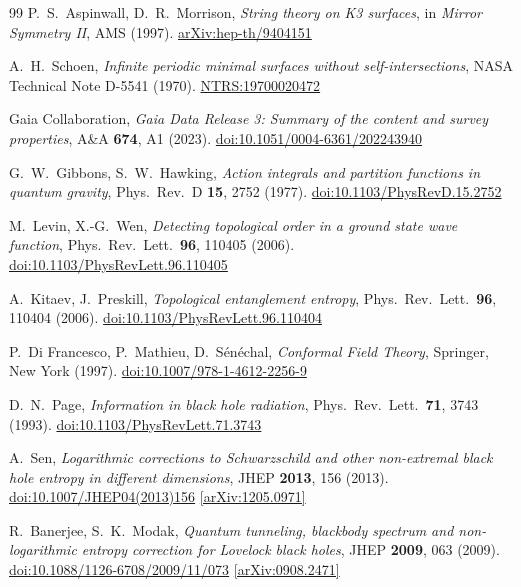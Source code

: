 \documentclass[11pt,a4paper]{article}
\begin{document}
\begin{thebibliography}{99}
  P.~S.~Aspinwall, D.~R.~Morrison,
  \textit{String theory on K3 surfaces},
  in \textit{Mirror Symmetry II}, AMS (1997).
  \href{https://arxiv.org/abs/hep-th/9404151}{arXiv:hep-th/9404151}

  A.~H.~Schoen,
  \textit{Infinite periodic minimal surfaces without self-intersections},
  NASA Technical Note D-5541 (1970).
  \href{https://ntrs.nasa.gov/citations/19700020472}{NTRS:19700020472}

  Gaia Collaboration,
  \textit{Gaia Data Release 3: Summary of the content and survey properties},
  A\&A \textbf{674}, A1 (2023).
  \href{https://doi.org/10.1051/0004-6361/202243940}{doi:10.1051/0004-6361/202243940}

  G.~W.~Gibbons, S.~W.~Hawking,
  \textit{Action integrals and partition functions in quantum gravity},
  Phys.\ Rev.\ D \textbf{15}, 2752 (1977).
  \href{https://doi.org/10.1103/PhysRevD.15.2752}{doi:10.1103/PhysRevD.15.2752}

  M.~Levin, X.-G.~Wen,
  \textit{Detecting topological order in a ground state wave function},
  Phys.\ Rev.\ Lett.\ \textbf{96}, 110405 (2006).
  \href{https://doi.org/10.1103/PhysRevLett.96.110405}{doi:10.1103/PhysRevLett.96.110405}

  A.~Kitaev, J.~Preskill,
  \textit{Topological entanglement entropy},
  Phys.\ Rev.\ Lett.\ \textbf{96}, 110404 (2006).
  \href{https://doi.org/10.1103/PhysRevLett.96.110404}{doi:10.1103/PhysRevLett.96.110404}

  P.~Di Francesco, P.~Mathieu, D.~S\'en\'echal,
  \textit{Conformal Field Theory},
  Springer, New York (1997).
  \href{https://doi.org/10.1007/978-1-4612-2256-9}{doi:10.1007/978-1-4612-2256-9}

  D.~N.~Page,
  \textit{Information in black hole radiation},
  Phys.\ Rev.\ Lett.\ \textbf{71}, 3743 (1993).
  \href{https://doi.org/10.1103/PhysRevLett.71.3743}{doi:10.1103/PhysRevLett.71.3743}

  A.~Sen,
  \textit{Logarithmic corrections to Schwarzschild and other non-extremal
    black hole entropy in different dimensions},
  JHEP \textbf{2013}, 156 (2013).
  \href{https://doi.org/10.1007/JHEP04(2013)156}{doi:10.1007/JHEP04(2013)156}
  \href{https://arxiv.org/abs/1205.0971}{[arXiv:1205.0971]}

  R.~Banerjee, S.~K.~Modak,
  \textit{Quantum tunneling, blackbody spectrum and non-logarithmic entropy
    correction for Lovelock black holes},
  JHEP \textbf{2009}, 063 (2009).
  \href{https://doi.org/10.1088/1126-6708/2009/11/073}{doi:10.1088/1126-6708/2009/11/073}
  \href{https://arxiv.org/abs/0908.2471}{[arXiv:0908.2471]}


\end{thebibliography}
\end{document}
